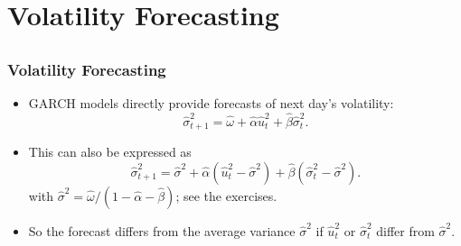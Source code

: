 \section[Forecasting]{Volatility Forecasting}\subsection*{}
\begin{frame}

\frametitle{Volatility Forecasting}

\begin{itemize}
\item GARCH models directly provide forecasts of next day's volatility:
\[
\widehat{\sigma} _{t+1}^{2}=\hat{\omega}+\hat{\alpha}\hat{u}_{t}^{2}+\hat{\beta} \widehat{\sigma} _{t}^{2}.
\]

\item This can also be
expressed as
\[
\widehat{\sigma} _{t+1}^{2}=\widehat{\sigma}^2+\hat{\alpha}(\hat{u}_{t}^{2}-\widehat{\sigma}^2)+\hat{\beta} (\widehat{\sigma} _{t}^{2}-\widehat{\sigma}^2).
\]
with $\widehat{\sigma}^2=\hat{\omega} /(1-\hat\alpha -\hat\beta )$; see the exercises.

\item So the forecast differs from
the average variance $\widehat{\sigma} ^{2}$ if $\hat{u}_{t}^{2}$ or $\widehat{\sigma}
_{t}^{2}$ differ from $\widehat{\sigma} ^{2}$.

\end{itemize}

\end{frame}%
